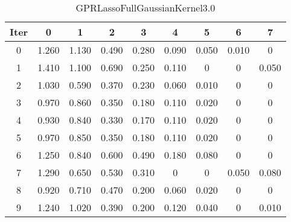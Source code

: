 \begin{table}
	\begin{center}
		\begin{tabular}{|c|c|c|c|c|c|c|c|c|}
			\hline
			Iter & 0 & 1 & 2 & 3 & 4 & 5 & 6 & 7 \\
			\hline
			0 & 1.260 & 1.130 & 0.490 & 0.280 & 0.090 & 0.050 & 0.010 & 0 \\
			\hline
			1 & 1.410 & 1.100 & 0.690 & 0.250 & 0.110 & 0 & 0 & 0.050 \\
			\hline
			2 & 1.030 & 0.590 & 0.370 & 0.230 & 0.060 & 0.010 & 0 & 0 \\
			\hline
			3 & 0.970 & 0.860 & 0.350 & 0.180 & 0.110 & 0.020 & 0 & 0 \\
			\hline
			4 & 0.930 & 0.840 & 0.330 & 0.170 & 0.110 & 0.020 & 0 & 0 \\
			\hline
			5 & 0.970 & 0.850 & 0.350 & 0.180 & 0.110 & 0.020 & 0 & 0 \\
			\hline
			6 & 1.250 & 0.840 & 0.600 & 0.490 & 0.180 & 0.080 & 0 & 0 \\
			\hline
			7 & 1.290 & 0.650 & 0.530 & 0.310 & 0 & 0 & 0.050 & 0.080 \\
			\hline
			8 & 0.920 & 0.710 & 0.470 & 0.200 & 0.060 & 0.020 & 0 & 0 \\
			\hline
			9 & 1.240 & 1.020 & 0.390 & 0.200 & 0.120 & 0.040 & 0 & 0.010 \\
			\hline
		\end{tabular}
	\end{center}
	\caption{GPRLassoFullGaussianKernel3.0}
\end{table}